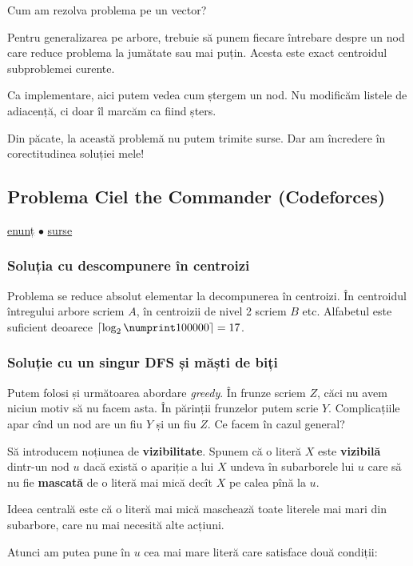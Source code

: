 \documentclass[../main.tex]{subfiles}
\begin{document}
Cum am rezolva problema pe un vector?

Pentru generalizarea pe arbore, trebuie să punem fiecare întrebare despre un nod care reduce problema la jumătate sau mai puțin. Acesta este exact centroidul subproblemei curente.

Ca implementare, aici putem vedea cum ștergem un nod. Nu modificăm listele de adiacență, ci doar îl marcăm ca fiind șters.

Din păcate, la această problemă nu putem trimite surse. Dar am încredere în corectitudinea soluției mele!

\subsection{Problema Ciel the Commander (Codeforces)}
\label{problem:ciel-the-commander}

\href{https://codeforces.com/contest/321/problem/C}{enunț}
$\bullet$
\hyperref[code:ciel-the-commander]{surse}

\subsubsection*{Soluția cu descompunere în centroizi}

Problema se reduce absolut elementar la decompunerea în centroizi. În centroidul întregului arbore scriem $A$, în centroizii de nivel 2 scriem $B$ etc. Alfabetul este suficient deoarece $\lceil \log_2 \np{100000} \rceil = 17$.

\subsubsection*{Soluție cu un singur DFS și măști de biți}

Putem folosi și următoarea abordare \textit{greedy}. În frunze scriem $Z$, căci nu avem niciun motiv să nu facem asta. În părinții frunzelor putem scrie $Y$. Complicațiile apar cînd un nod are un fiu $Y$ și un fiu $Z$. Ce facem în cazul general?

Să introducem noțiunea de \textbf{vizibilitate}. Spunem că o literă $X$ este \textbf{vizibilă} dintr-un nod $u$ dacă există o apariție a lui $X$ undeva în subarborele lui $u$ care să nu fie \textbf{mascată} de o literă mai mică decît $X$ pe calea pînă la $u$.

Ideea centrală este că o literă mai mică maschează toate literele mai mari din subarbore, care nu mai necesită alte acțiuni.

Atunci am putea pune în $u$ cea mai mare literă care satisface două condiții:
\end{document}
